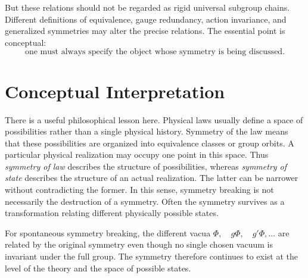 But these relations should not be regarded as rigid universal subgroup chains.
Different definitions of equivalence, gauge redundancy, action invariance, and
generalized symmetries may alter the precise relations.
The essential point is conceptual:
\[
\boxed{
\text{one must always specify the object whose symmetry is being discussed}.
}
\]

\section{Conceptual Interpretation}
There is a useful philosophical lesson here.
Physical laws usually define a space of possibilities rather than a single
physical history. Symmetry of the law means that these possibilities are
organized into equivalence classes or group orbits. A particular physical
realization may occupy one point in this space.
Thus \emph{symmetry of law} describes the structure of possibilities,
whereas \emph{symmetry of state} 
describes the structure of an actual realization.
The latter can be narrower without contradicting the former.
In this sense, symmetry breaking is not necessarily the destruction of a
symmetry.  Often the symmetry survives as a transformation relating different
physically possible states.

For spontaneous symmetry breaking, the different vacua
$\Phi,\quad g\Phi,\quad g'\Phi,\ldots$
are related by the original symmetry even though no single chosen vacuum is
invariant under the full group. The symmetry therefore continues to exist at
the level of the theory and the space of possible states.

